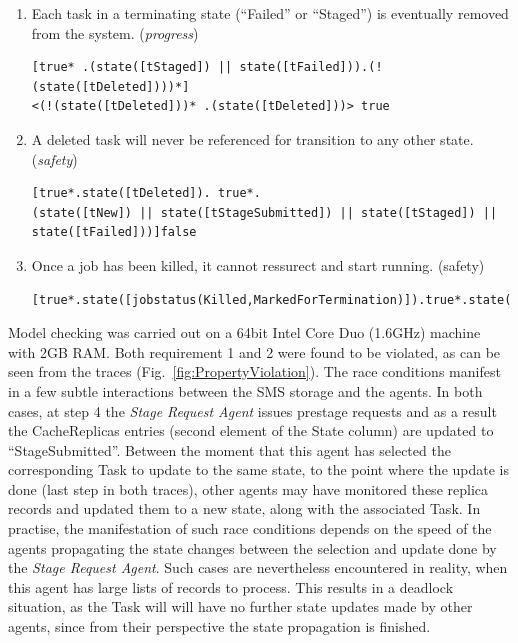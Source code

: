 \documentclass[10pt,conference]{IEEEtran}
\begin{document}
\begin{enumerate}
\item Each task in a terminating state (``Failed'' or ``Staged'') is eventually removed from the system. (\textit{progress})

\begin{lstlisting}[basicstyle=\ttfamily\fontsize{8}{9}\selectfont]
[true* .(state([tStaged]) || state([tFailed])).(!(state([tDeleted])))*] 
<(!(state([tDeleted]))* .(state([tDeleted]))> true
\end{lstlisting} 

\item A deleted task will never be referenced for transition to any other state. (\textit{safety})
\begin{lstlisting}[basicstyle=\ttfamily\fontsize{8}{9}\selectfont]
[true*.state([tDeleted]). true*. 
(state([tNew]) || state([tStageSubmitted]) || state([tStaged]) || state([tFailed]))]false
\end{lstlisting}
\item Once a job has been killed, it cannot ressurect and start running. (safety)

\begin{lstlisting}[basicstyle=\ttfamily\fontsize{8}{9}\selectfont]
[true*.state([jobstatus(Killed,MarkedForTermination)]).true*.state([jobstatus(Running,JobInitialization)])]false
\end{lstlisting} 

\end{enumerate}


Model checking was carried out on a 64bit Intel Core Duo (1.6GHz) machine with 2GB RAM.
Both requirement 1 and 2 were found to be violated, as can be seen from the traces (Fig.~\ref{fig:PropertyViolation}).
The race conditions manifest in a few subtle interactions between the SMS storage and the agents.
In both cases, at step 4 the \textit{Stage Request Agent} issues prestage requests and 
as a result the CacheReplicas entries (second element of the State column) are updated to ``StageSubmitted''. Between the moment
that this agent has selected the corresponding Task to update to the same state,
to the point where the update is done (last step in both traces),
other agents may have monitored these replica records and updated
them to a new state, along with the associated Task. In practise, the manifestation
of such race conditions depends on the speed of the agents propagating the
state changes between the selection and update done by the \textit{Stage Request Agent}.
Such cases are nevertheless encountered in reality, when this agent
has large lists of records to process. This results in a deadlock situation, as 
the Task will will have no further state updates made by other agents, since
from their perspective the state propagation is finished.
\end{document}
